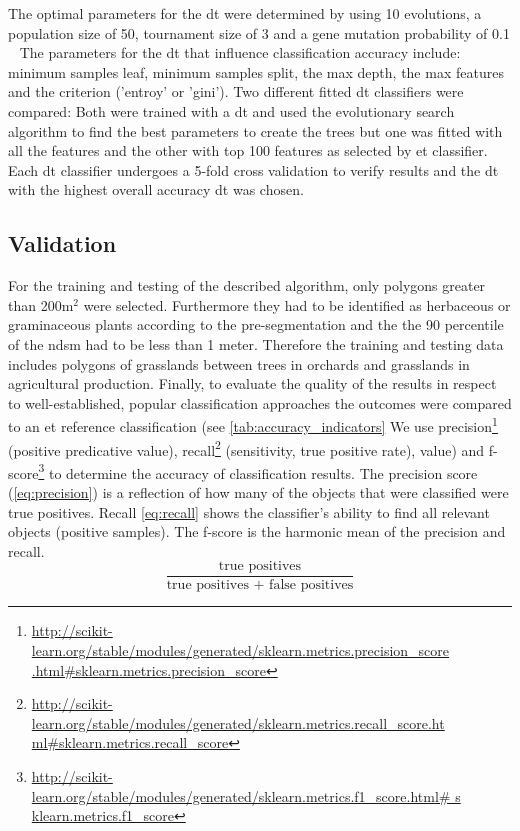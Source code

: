 \documentclass[authoryear,review,12pt,number]{elsarticle}
\begin{document}
The optimal parameters for the \gls{dt} were determined by using 10 evolutions, 
a population size of 50, tournament size of 3 and a gene mutation probability 
of 0.1 ~\citep{DEAP_JMLR2012} The parameters for the \gls{dt} that influence 
classification accuracy include: minimum samples leaf, minimum samples split, 
the max depth, the max features and the criterion ('entroy' or 'gini'). Two 
different fitted \gls{dt} classifiers were compared: Both were trained with a 
\gls{dt} and used the evolutionary search algorithm to find the best parameters 
to create the trees but one was fitted with all the features and the other with 
top 100 features as selected by \gls{et} classifier. Each \gls{dt} classifier 
undergoes a 5-fold cross validation to verify results and the \gls{dt} with the 
highest overall accuracy \gls{dt} was chosen.
\label{subsec:rulegen_data_mining}

\subsection{Validation} 
\label{subsec:Validation}
For the training and testing of the described algorithm, only polygons greater
than 200m$^{2}$ were selected. Furthermore they had to be identified as
herbaceous or graminaceous plants according to the pre-segmentation and the 
the 90 percentile of the \gls{ndsm} had to be less than 1 meter. Therefore the
training and testing data includes polygons of grasslands between trees in
orchards and grasslands in agricultural production. Finally, to evaluate the
quality of the results in respect to well-established, popular classification
approaches the outcomes were compared to an \gls{et} reference classification
(see
\ref{tab:accuracy_indicators}
We use precision\footnote{\url{
http://scikit-learn.org/stable/modules/generated/sklearn.metrics.precision_score
.html\#sklearn.metrics.precision\_score}} (positive predicative value), 
recall\footnote{\url{
http://scikit-learn.org/stable/modules/generated/sklearn.metrics.recall_score.ht
ml\#sklearn.metrics.recall\_score}} (sensitivity, true positive rate), 
value) and 
f-score\footnote{\url{
http://scikit-learn.org/stable/modules/generated/sklearn.metrics.f1_score.html\#
s
klearn.metrics.f1\_score}} to determine the accuracy of classification results. 
The precision score (\ref{eq:precision}) is a reflection of how many of the 
objects that were classified were true positives. Recall \ref{eq:recall} shows 
the classifier's ability to find all relevant objects (positive samples). The 
f-score is the harmonic mean of the precision and recall.
\begin{equation}\label{eq:precision}
    \frac{\text{true positives}}{\text{true positives + false positives}}
\end{equation}
\end{document}
